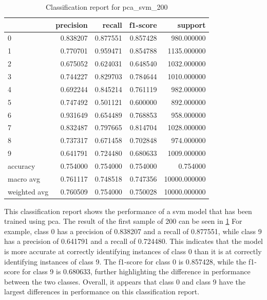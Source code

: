 \begin{table}[htb!]
    \centering
    \begin{tabular}{lrrrr}
        \toprule
        & precision & recall & f1-score & support \\
        \midrule
        0 & 0.838207 & 0.877551 & 0.857428 & 980.000000 \\
        1 & 0.770701 & 0.959471 & 0.854788 & 1135.000000 \\
        2 & 0.675052 & 0.624031 & 0.648540 & 1032.000000 \\
        3 & 0.744227 & 0.829703 & 0.784644 & 1010.000000 \\
        4 & 0.692244 & 0.845214 & 0.761119 & 982.000000 \\
        5 & 0.747492 & 0.501121 & 0.600000 & 892.000000 \\
        6 & 0.931649 & 0.654489 & 0.768853 & 958.000000 \\
        7 & 0.832487 & 0.797665 & 0.814704 & 1028.000000 \\
        8 & 0.737317 & 0.671458 & 0.702848 & 974.000000 \\
        9 & 0.641791 & 0.724480 & 0.680633 & 1009.000000 \\
        accuracy & 0.754000 & 0.754000 & 0.754000 & 0.754000 \\
        macro avg & 0.761117 & 0.748518 & 0.747356 & 10000.000000 \\
        weighted avg & 0.760509 & 0.754000 & 0.750028 & 10000.000000 \\
        \bottomrule
    \end{tabular}
    \caption{Classification report for pca\_svm\_200}
    \label{tab:classification-report-pca_svm_200}
\end{table}


This classification report shows the performance of a \gls{svm} model that has been trained using \gls{pca}. The result of the first sample of 200 can be seen in \ref{tab:classification-report-pca_svm_200}
For example, class 0 has a precision of 0.838207 and a recall of 0.877551, while class 9 has a precision of 0.641791 and a recall of 0.724480. This indicates that the model is more accurate at correctly identifying instances of class 0 than it is at correctly identifying instances of class 9. The f1-score for class 0 is 0.857428, while the f1-score for class 9 is 0.680633, further highlighting the difference in performance between the two classes. Overall, it appears that class 0 and class 9 have the largest differences in performance on this classification report.


